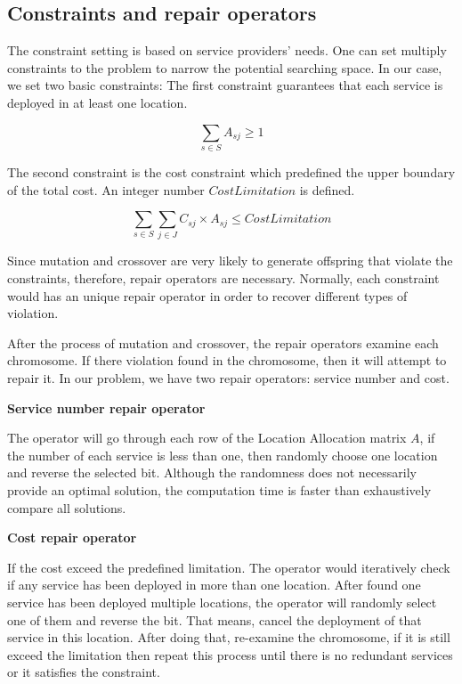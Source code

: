 \documentclass{llncs}
\begin{document}
\subsection{Constraints and repair operators}
The constraint setting is based on service providers' needs. One can set multiply constraints to the problem to narrow the potential searching space.
In our case, we set two basic constraints: The first constraint guarantees that each service is deployed in at 
least one location.
\begin{center}
	\begin{equation}
		\sum\limits_{s \in S} A_{sj} \geq 1
	\end{equation}
\end{center}

The second constraint is the cost constraint which predefined the upper boundary of the total cost.
An integer number $CostLimitation$ is defined.
\begin{center}
	\begin{equation}
		\sum\limits_{s \in S} \sum\limits_{j \in J} C_{sj} \times A_{sj} \leq CostLimitation
	\end{equation}
\end{center}

Since mutation and crossover are very likely to generate offspring that violate the constraints, therefore, 
repair operators are necessary. Normally, each constraint would has an unique repair operator 
in order to recover different types of violation.

After the process of mutation and crossover, the repair operators examine each chromosome. 
If there violation found in the chromosome, then it will attempt to repair it. 
In our problem, we have two repair operators: service number and cost.

\begin{flushleft}\textbf{Service number repair operator}\end{flushleft}
The operator will go through each row of the Location Allocation matrix $A$, if the number of each 
service is less than one, then randomly choose one location and reverse the selected bit. 
Although the randomness does not necessarily provide an optimal solution, the computation time is 
faster than exhaustively compare all solutions. 


\begin{flushleft}\textbf{Cost repair operator}\end{flushleft}
If the cost exceed the predefined limitation. The operator would iteratively check if any service has 
been deployed in more than one location. After found one service has been deployed multiple locations, 
the operator will randomly select one of them and reverse the bit. That means, cancel the deployment of 
that service in this location. After doing that, re-examine the chromosome, if it is still exceed the 
limitation then repeat this process until there is no redundant services or it satisfies the constraint.
\end{document}
